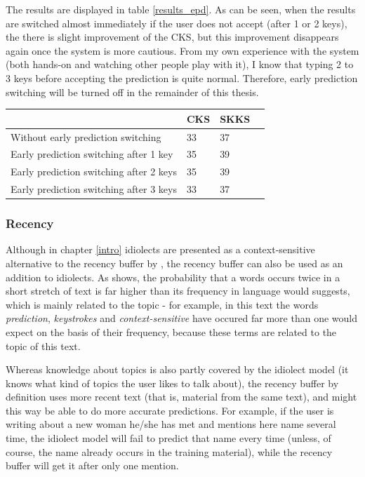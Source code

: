 \documentclass[12pt]{article}
\let\originaltable\table
\let\endoriginaltable\endtable
\renewenvironment{table}[1][ht]{%
  \originaltable[#1]
  \centering}%
  {\endoriginaltable}
\begin{document}
The results are displayed in table \ref{results_epd}. As can be seen, when the results are switched almost immediately if the user does not accept (after 1 or 2 keys), the there is slight improvement of the CKS, but this improvement disappears again once the system is more cautious. From my own experience with the system (both hands-on and watching other people play with it), I know that typing 2 to 3 keys before accepting the prediction is quite normal. Therefore, early prediction switching will be turned off in the remainder of this thesis.

\begin{table}[h]
\begin{tabular}{l|lll} 

&CKS&SKKS\\
\hline
Without early prediction switching&33&37\\
Early prediction switching after 1 key&35&39\\
Early prediction switching after 2 keys&35&39\\
Early prediction switching after 3 keys&33&37\\
\end{tabular} 
\caption{Percentage of keystrokes saved with and without early prediction switching.} \label{results_epd}
\end{table}


\subsubsection{Recency} \label{rb}

Although in chapter \ref{intro} idiolects are presented as a context-sensitive alternative to the recency buffer by , the recency buffer can also be used as an addition to idiolects. As  shows, the probability that a words occurs twice in a short stretch of text is far higher than its  frequency in language would suggests, which is mainly related to the topic - for example, in this text the words \emph{prediction}, \emph{keystrokes} and \emph{context-sensitive} have occured far more than one would expect on the basis of their frequency, because these terms are related to the topic of this text. 

Whereas knowledge about topics is also partly covered by the idiolect model (it knows what kind of topics the user likes to talk about), the recency buffer by definition uses more recent text (that is, material from the same text), and might this way be able to do more accurate predictions. For example, if the user is writing about a new woman he/she has met and mentions here name several time, the idiolect model will fail to predict that name every time (unless, of course, the name already occurs in the training material), while the recency buffer will get it after only one mention.
\end{document}
